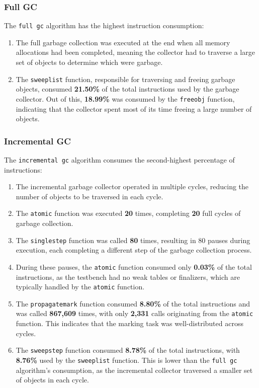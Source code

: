 \documentclass[10pt]{article}
\begin{document}
\subsubsection{Full GC}
The \texttt{full gc} algorithm has the highest instruction consumption:
\begin{enumerate}
    \item The full garbage collection was executed at the end when all memory allocations had been completed, meaning the collector had to traverse a large set of objects to determine which were garbage.
    \item The \texttt{sweeplist} function, responsible for traversing and freeing garbage objects, consumed \textbf{21.50\%} of the total instructions used by the garbage collector. Out of this, \textbf{18.99\%} was consumed by the \texttt{freeobj} function, indicating that the collector spent most of its time freeing a large number of objects.
\end{enumerate}

\subsubsection{Incremental GC}
The \texttt{incremental gc} algorithm consumes the second-highest percentage of instructions:
\begin{enumerate}
    \item The incremental garbage collector operated in multiple cycles, reducing the number of objects to be traversed in each cycle.
    \item The \texttt{atomic} function was executed \textbf{20} times, completing \textbf{20} full cycles of garbage collection. 
    \item The \texttt{singlestep} function was called \textbf{80} times, resulting in 80 pauses during execution, each completing a different step of the garbage collection process.
    \item During these pauses, the \texttt{atomic} function consumed only \textbf{0.03\%} of the total instructions, as the testbench had no weak tables or finalizers, which are typically handled by the \texttt{atomic} function.
    \item The \texttt{propagatemark} function consumed \textbf{8.80\%} of the total instructions and was called \textbf{867,609} times, with only \textbf{2,331} calls originating from the \texttt{atomic} function. This indicates that the marking task was well-distributed across cycles.
    \item The \texttt{sweepstep} function consumed \textbf{8.78\%} of the total instructions, with \textbf{8.76\%} used by the \texttt{sweeplist} function. This is lower than the \texttt{full gc} algorithm's consumption, as the incremental collector traversed a smaller set of objects in each cycle.
\end{enumerate}
\end{document}
